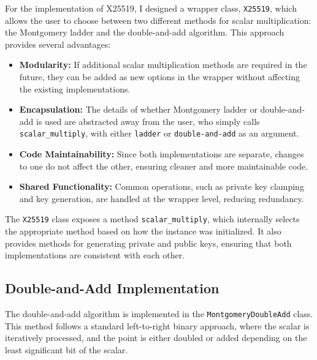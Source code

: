 \documentclass[twoside,a4paper,12pt]{article}
\begin{document}
For the implementation of X25519, I designed a wrapper class, \texttt{X25519}, which allows the user to choose between two different methods for scalar multiplication: the Montgomery ladder and the double-and-add algorithm. This approach provides several advantages:
\begin{itemize}
    \item \textbf{Modularity:} If additional scalar multiplication methods are required in the future, they can be added as new options in the wrapper without affecting the existing implementations.
    \item \textbf{Encapsulation:} The details of whether Montgomery ladder or double-and-add is used are abstracted away from the user, who simply calls \texttt{scalar\_multiply}, with either \texttt{ladder} or \texttt{double-and-add} as an argument.
    \item \textbf{Code Maintainability:} Since both implementations are separate, changes to one do not affect the other, ensuring cleaner and more maintainable code.
    \item \textbf{Shared Functionality:} Common operations, such as private key clamping and key generation, are handled at the wrapper level, reducing redundancy.
\end{itemize}

The \texttt{X25519} class exposes a method \texttt{scalar\_multiply}, which internally selects the appropriate method based on how the instance was initialized. It also provides methods for generating private and public keys, ensuring that both implementations are consistent with each other.

\subsection{Double-and-Add Implementation}
\label{subsec:x25519_double_add}

The double-and-add algorithm is implemented in the \texttt{MontgomeryDoubleAdd} class. This method follows a standard left-to-right binary approach, where the scalar is iteratively processed, and the point is either doubled or added depending on the least significant bit of the scalar.
\end{document}
